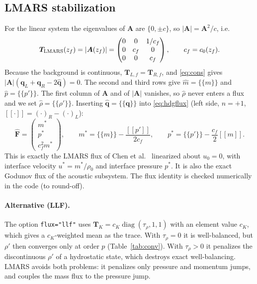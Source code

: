\documentclass[11pt,a4paper]{article}
\newcommand{\avg}[1]{\{\!\{#1\}\!\}}
\newcommand{\jump}[1]{[\![#1]\!]}
\newcommand{\qh}{\hat{\bm q}}
\newcommand{\q}{\bm q}
\begin{document}
\subsection{LMARS stabilization}
For the linear system the eigenvalues of $\bm A$ are $\{0,\pm c\}$, so
$|\bm A| = \bm A^2/c$, i.e.
\begin{equation}
\bm T_{\rm LMARS}(z_f) = |\bm A(z_f)| = \begin{pmatrix}0&0&1/c_f\\0&c_f&0\\0&0&c_f\end{pmatrix},
\qquad c_f=c_0(z_f).
\end{equation}
Because the background is continuous, $\bm T_{L,f}=\bm T_{R,f}$, and \eqref{eq:cons} gives
$|\bm A|(\q_L+\q_R-2\qh)=0$. The second and third rows give $\hat m=\avg{m}$ and
$\hat p=\avg{p'}$. The first column of $\bm A$ and of $|\bm A|$ vanishes, so $\hat\rho$ never
enters a flux and we set $\hat\rho=\avg{\rho'}$. Inserting $\qh=\avg{\q}$ into \eqref{eq:hdgflux}
(left side, $n=+1$, $\jump{\cdot}=(\cdot)_R-(\cdot)_L$):
\begin{equation}\label{eq:lmars}
\widehat{\bm F} = \begin{pmatrix} m^\ast\\ p^\ast\\ c_f^2 m^\ast\end{pmatrix},\qquad
m^\ast=\avg{m}-\frac{\jump{p'}}{2c_f},\qquad p^\ast=\avg{p'}-\frac{c_f}{2}\jump{m}.
\end{equation}
This is exactly the LMARS flux of Chen et al.~\cite{chen2013} linearized about $u_0=0$, with
interface velocity $u^\ast=m^\ast/\rho_0$ and interface pressure $p^\ast$. It is also the exact
Godunov flux of the acoustic subsystem. The flux identity is checked numerically in the code
(to round-off).

\paragraph{Alternative (LLF).} The option \texttt{flux="llf"} uses
$\bm T_K=c_K\operatorname{diag}(\tau_\rho,1,1)$ with an element value $c_K$, which gives a
$c_K$-weighted mean as the trace. With $\tau_\rho=0$ it is well-balanced, but $\rho'$ then
converges only at order $p$ (Table~\ref{tab:conv}). With $\tau_\rho>0$ it penalizes the
discontinuous $\rho'$ of a hydrostatic state, which destroys exact well-balancing. LMARS avoids
both problems: it penalizes only pressure and momentum jumps, and couples the mass flux to the
pressure jump.
\end{document}
